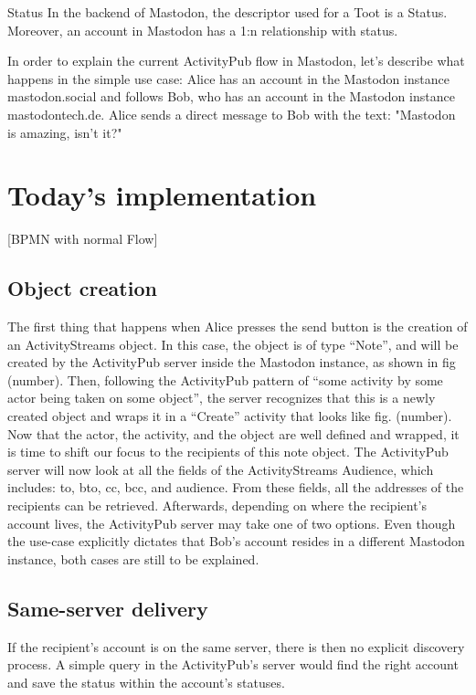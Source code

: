 Status
In the backend of Mastodon, the descriptor used for a Toot is a Status. Moreover, an account in Mastodon has a 1:n relationship with status.

In order to explain the current ActivityPub flow in Mastodon, let’s describe what happens in the simple use case: 
Alice has an account in the Mastodon instance mastodon.social and follows Bob, who has an account in the Mastodon instance mastodontech.de. Alice sends a direct message to Bob with the text: "Mastodon is amazing, isn’t it?" 

\section{Today's implementation}

[BPMN with normal Flow]

\subsection*{Object creation}
The first thing that happens when Alice presses the send button is the creation of an ActivityStreams object. In this case, the object is of type “Note”, and will be created by the ActivityPub server inside the Mastodon instance, as shown in fig (number). Then, following the ActivityPub pattern of “some activity by some actor being taken on some object”, the server recognizes that this is a newly created object and wraps it in a “Create” activity that looks like fig. (number). Now that the actor, the activity, and the object are well defined and wrapped, it is time to shift our focus to the recipients of this note object. 
The ActivityPub server will now look at all the fields of the ActivityStreams Audience, which includes: to, bto, cc, bcc, and audience. From these fields, all the addresses of the recipients can be retrieved. Afterwards, depending on where the recipient’s account lives, the ActivityPub server may take one of two options. Even though the use-case explicitly dictates that Bob’s account resides in a different Mastodon instance, both cases are still to be explained. 


\subsection*{Same-server delivery}
If the recipient’s account is on the same server, there is then no explicit discovery process. A simple query in the ActivityPub’s server would find the right account and save the status within the account’s statuses. 


